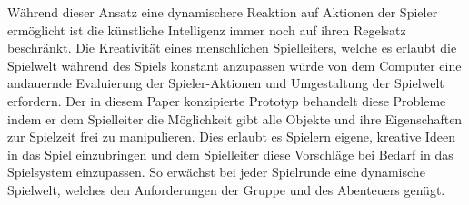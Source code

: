 Während dieser Ansatz eine dynamischere Reaktion auf Aktionen der Spieler ermöglicht ist die künstliche Intelligenz immer noch auf ihren Regelsatz beschränkt. Die Kreativität eines menschlichen Spielleiters, welche es erlaubt die Spielwelt während des Spiels konstant anzupassen würde von dem Computer eine andauernde Evaluierung der Spieler-Aktionen und Umgestaltung der Spielwelt erfordern.\newline
Der in diesem Paper konzipierte Prototyp behandelt diese Probleme indem er dem Spielleiter die Möglichkeit gibt alle Objekte und ihre Eigenschaften zur Spielzeit frei zu manipulieren. Dies erlaubt es Spielern eigene, kreative Ideen in das Spiel einzubringen und dem Spielleiter diese Vorschläge bei Bedarf in das Spielsystem einzupassen. So erwächst bei jeder Spielrunde eine dynamische Spielwelt, welches den Anforderungen der Gruppe und des Abenteuers genügt.
